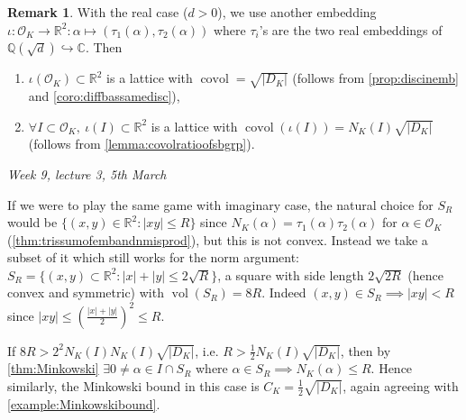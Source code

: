 \documentclass{article}
\newcommand{\Q}{\mathbb{Q}}
\newcommand{\R}{\mathbb{R}}
\newcommand{\C}{\mathbb{C}}
\newcommand{\vol}{\operatorname{vol}}
\newcommand{\covol}{\operatorname{covol}}
\newcommand{\ri}{\mathcal{O}}
\theoremstyle{definition}
\newtheorem{remark}[defn]{Remark}
\begin{document}
\begin{remark}
\label{remark:realquadlattemb}
With the real case ($d>0$), we use another embedding $\iota:\ri_K\rightarrow\R^2:\alpha\mapsto(\tau_1(\alpha),\tau_2(\alpha))$ where $\tau_i$'s are the two real embeddings of $\Q\left(\sqrt d\right)\hookrightarrow\C$. Then
\begin{enumerate}
\item $\iota(\ri_K)\subset\R^2$ is a lattice with $\covol=\sqrt{|D_K|}$ (follows from \ref{prop:discinemb} and \ref{coro:diffbassamedisc}),
\item $\forall I\subset\ri_K,\ \iota(I)\subset\R^2$ is a lattice with $\covol(\iota(I))=N_K(I)\sqrt{|D_K|}$ (follows from \ref{lemma:covolratioofsbgrp}).
\end{enumerate}

\begin{flushright}
\textit{Week 9, lecture 3, 5th March}
\end{flushright}

If we were to play the same game with imaginary case, the natural choice for $S_R$ would be $\{(x,y)\in\R^2:|xy|\leq R\}$ since $N_K(\alpha)=\tau_1(\alpha)\tau_2(\alpha)$ for $\alpha\in\ri_K$ (\ref{thm:trissumofembandnmisprod}), but this is not convex. Instead we take a subset of it which still works for the norm argument: $S_R=\{(x,y)\subset\R^2:|x|+|y|\leq 2\sqrt{R}\}$, a square with side length $2\sqrt{2R}$ (hence convex and symmetric) with $\vol(S_R)=8R$. Indeed $(x,y)\in S_R\implies |xy|<R$ since $|xy|\leq\left(\frac{|x|+|y|}{2}\right)^2\leq R$.

If $8R>2^2N_K(I)N_K(I)\sqrt{|D_K|}$, i.e. $R>\frac12 N_K(I)\sqrt{|D_K|}$, then by \ref{thm:Minkowski} $\exists 0\neq\alpha\in I\cap S_R$ where $\alpha\in S_R\implies N_K(\alpha)\leq R$. Hence similarly, the Minkowski bound in this case is $C_K=\frac12\sqrt{|D_K|}$, again agreeing with \ref{example:Minkowskibound}.
\end{remark}
\end{document}
